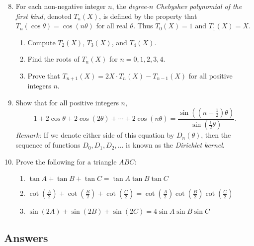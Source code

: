 \begin{enumerate}\setcounter{enumi}{7}
\item For each non-negative integer $n$, the \emph{degree-$n$ Chebyshev polynomial of the first kind}, denoted $T_n(X)$, is defined by the property that $T_n(\cos\theta) = \cos(n\theta)$ for all real $\theta$. Thus $T_0(X) = 1$ and $T_1(X) = X$.
\begin{enumerate}
\item Compute $T_2(X)$, $T_3(X)$, and $T_4(X)$.
\item Find the roots of $T_n(X)$ for $n = 0, 1, 2, 3, 4$.
\item Prove that $T_{n + 1}(X) = 2X\cdot T_n(X) - T_{n - 1}(X)$ for all positive integers $n$.
\end{enumerate}
\item Show that for all positive integers $n$,
\begin{equation*}
1 + 2\cos\theta + 2\cos(2\theta) + \cdots + 2\cos(n\theta) = \frac{\sin((n + \frac{1}{2})\theta)}{\sin(\frac{1}{2}\theta)}.
\end{equation*}
\emph{Remark:} If we denote either side of this equation by $D_n(\theta)$, then the sequence of functions $D_0, D_1, D_2, \ldots$ is known as the \emph{Dirichlet kernel}.
\item Prove the following for a triangle $ABC$:
\begin{enumerate}
\item $\tan A + \tan B + \tan C = \tan A\tan B\tan C$
\item $\cot(\frac{A}{2}) + \cot(\frac{B}{2}) + \cot(\frac{C}{2}) = \cot(\frac{A}{2})\cot(\frac{B}{2})\cot(\frac{C}{2})$
\item $\sin(2A) + \sin(2B) + \sin(2C) = 4\sin A\sin B\sin C$
\end{enumerate}
\end{enumerate}


\newpage
\subsection{Answers}

